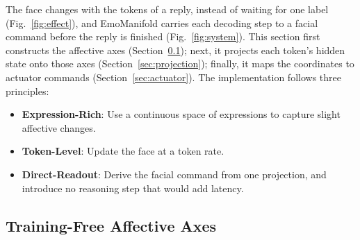 \documentclass[letterpaper, 10 pt, conference]{ieeeconf/ieeeconf}
\begin{document}
The face changes with the tokens of a reply, instead of waiting for one label (Fig.~\ref{fig:effect}), and EmoManifold carries each decoding step to a facial command before the reply is finished (Fig.~\ref{fig:system}). This section first constructs the affective axes (Section~\ref{sec:axis_mining}); next, it projects each token's hidden state onto those axes (Section~\ref{sec:projection}); finally, it maps the coordinates to actuator commands (Section~\ref{sec:actuator}). The implementation follows three principles:
\begin{itemize}
\item \textbf{Expression-Rich}: Use a continuous space of expressions to capture slight affective changes.
\item \textbf{Token-Level}: Update the face at a token rate.
\item \textbf{Direct-Readout}: Derive the facial command from one projection, and introduce no reasoning step that would add latency.
\end{itemize}

\subsection{Training-Free Affective Axes}
\label{sec:axis_mining}
\end{document}
